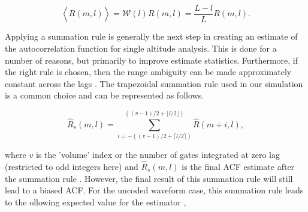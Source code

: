 \documentclass[draft,ras]{agutex}
\begin{document}
\begin{article}
\begin{equation}
\label{eq:lagprobias}
\left\langle\widehat{R}(m,l) \right\rangle = \mathcal{W}(l)R(m,l) =\frac{L-l}{L}R(m,l).
\end{equation}
%
%

Applying a summation rule is generally the next step in creating an estimate of the autocorrelation function for single altitude analysis. This is done for a number of reasons, but primarily to improve estimate statistics.  Furthermore, if the right rule is chosen, then the range ambiguity can be made approximately constant across the lags \citep{nygren1996}. 
The trapezoidal summation rule used in our simulation is a common choice and can be represented as follows.

\begin{equation}
\label{eq:sumrule}
\widehat{R}_s(m,l) = \displaystyle\sum\limits_{i=-((v-1)/2+\lceil l/2 \rceil)}^{((v-1)/2+\lfloor l/2\rfloor)} \widehat{R}(m+i,l),
\end{equation}

\noindent where $v$ is the 'volume' index or the number of gates integrated at zero lag (restricted to odd integers here) and $\widehat{R}_s(m,l)$ is the final ACF estimate after the summation rule \citep{nygren1996}. 
However, the final result of this summation rule will still lead to a biased ACF. For the uncoded waveform case, this summation rule leads to the ollowing expected value for the estimator \citep{nygren1996},


\end{article}
\end{document}
